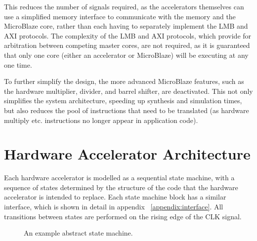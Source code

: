 \documentclass{UoYCSproject}
\begin{document}
This reduces the number of signals required, as the accelerators themselves can use a simplified memory interface to communicate
with the memory and the MicroBlaze core, rather than each having to separately implement the LMB and AXI protocols.
The complexity of the LMB and AXI protocols, which provide for arbitration between competing master cores, are not required,
as it is guaranteed that only one core (either an accelerator or MicroBlaze) will be executing at any one time.

To further simplify the design, the more advanced MicroBlaze features, such as the hardware multiplier, divider, and barrel
shifter, are deactivated. This not only simplifies the system architecture, speeding up synthesis and simulation times, but also
reduces the pool of instructions that need to be translated (as hardware multiply etc. instructions no longer appear in
application code).

\section{Hardware Accelerator Architecture}

Each hardware accelerator is modelled as a sequential state machine, with a sequence of states determined by the structure
of the code that the hardware accelerator is intended to replace. Each state machine block has a similar interface, which is
shown in detail in appendix ~\ref{appendix:interface}. All transitions between states are performed on the rising
edge of the CLK signal.

\begin{figure}[H]
\centering
{}
\caption{An example abstract state machine.}
\label{fig:abstractStateMachine}
\end{figure}
\end{document}
